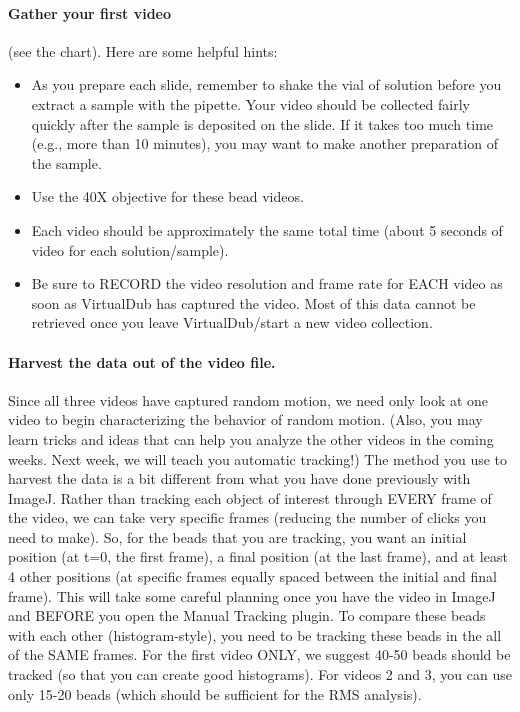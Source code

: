 \paragraph*{Gather your first video} (see the chart). Here are some helpful hints:
\begin{itemize}
\item As you prepare each slide, remember to shake the vial of solution before you extract a sample with the pipette. Your video should be collected fairly quickly after the sample is deposited on the slide. If it takes too much time (e.g., more than 10 minutes), you may want to make another preparation of the sample.
\item Use the 40X objective for these bead videos.
\item Each video should be approximately the same total time (about 5 seconds of video for each solution/sample).
\item Be sure to RECORD the video resolution and frame rate for EACH video as soon as VirtualDub has captured the video. Most of this data cannot be retrieved once you leave VirtualDub/start a new video collection.
\end{itemize}
\paragraph*{Harvest the data out of the video file.}
Since all three videos have captured random motion, we need only look at one video to begin characterizing the behavior of random motion. 
(Also, you may learn tricks and ideas that can help you analyze the other videos in the coming weeks. Next week, we will teach you automatic tracking!) 
The method you use to harvest the data is a bit different from what you have done previously with ImageJ. 
Rather than tracking each object of interest through EVERY frame of the video, we can take very specific frames (reducing the number of clicks you need to make). 
So, for the beads that you are tracking, you want an initial position (at t=0, the first frame), a final position (at the last frame), and at least 4 other positions (at specific frames equally spaced between the initial and final frame). 
This will take some careful planning once you have the video in ImageJ and BEFORE you open the Manual Tracking plugin. 
To compare these beads with each other (histogram-style), you need to be tracking these beads in the all of the SAME frames. 
For the first video ONLY, we suggest 40-50 beads should be tracked (so that you can create good histograms). 
For videos 2 and 3, you can use only 15-20 beads (which should be sufficient for the RMS analysis).

